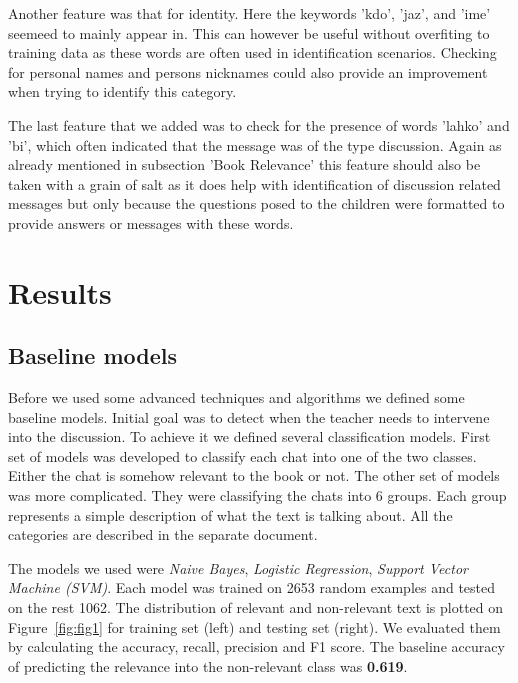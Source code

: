 \documentclass[11pt,a4paper]{article}
\begin{document}
Another feature was that for identity.
Here the keywords 'kdo', 'jaz', and 'ime' seemeed to mainly appear in.
This can however be useful without overfiting to training data as these words are often used in identification scenarios.
Checking for personal names and persons nicknames could also provide an improvement when trying to identify this category.

The last feature that we added was to check for the presence of words 'lahko' and 'bi', which often indicated that the message was of the type discussion.
Again as already mentioned in subsection 'Book Relevance' this feature should also be taken with a grain of salt as it does help with identification of discussion related messages but only because the questions posed to the children were formatted to provide answers or messages with these words. 

\section{Results} 

\subsection{Baseline models}
Before we used some advanced techniques and algorithms we defined some baseline models.
Initial goal was to detect when the teacher needs to intervene into the discussion.
To achieve it we defined several classification models.
First set of models was developed to classify each chat into one of the two classes.
Either the chat is somehow relevant to the book or not.
The other set of models was more complicated.
They were classifying the chats into 6 groups.
Each group represents a simple description of what the text is talking about.
All the categories are described in the separate document. %

The models we used were \textit{Naive Bayes}, \textit{Logistic Regression}, \textit{Support Vector Machine (SVM)}.
Each model was trained on 2653 random examples and tested on the rest 1062.
The distribution of relevant and non-relevant text is plotted on Figure~\ref{fig:fig1} for training set (left) and testing set (right).
We evaluated them by calculating the accuracy, recall, precision and F1 score.
The baseline accuracy of predicting the relevance into the non-relevant class was \textbf{0.619}.
\end{document}
